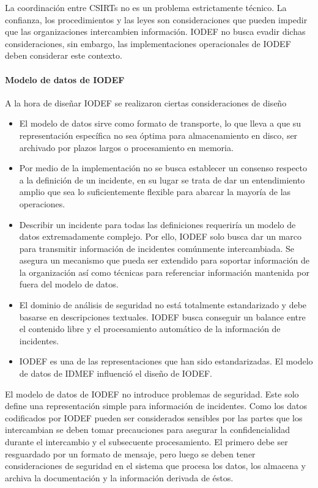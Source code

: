 La coordinación entre CSIRTs no es un problema estrictamente técnico. La 
confianza, los procedimientos y las leyes son consideraciones que pueden impedir 
que las organizaciones intercambien información. IODEF no busca evadir dichas 
consideraciones, sin embargo, las implementaciones operacionales de IODEF deben 
considerar este contexto.

\paragraph{Modelo de datos de IODEF}

A la hora de diseñar IODEF se realizaron ciertas consideraciones de diseño
\begin{itemize}
  \item El modelo de datos sirve como formato de transporte, lo que lleva a que 
  su representación específica no sea óptima para almacenamiento en disco, 
  ser archivado por plazos largos o procesamiento en memoria.
  \item Por medio de la implementación no se busca establecer un consenso 
  respecto a la definición de un incidente, en su lugar se trata de dar un 
  entendimiento amplio que sea lo suficientemente flexible para abarcar la 
  mayoría de las operaciones.
  \item Describir un incidente para todas las definiciones requeriría un modelo 
  de datos extremadamente complejo. Por ello, IODEF solo busca dar un marco para 
  transmitir información de incidentes comúnmente intercambiada. Se asegura un 
  mecanismo que pueda ser extendido para soportar información de la 
  organización así como técnicas para referenciar información mantenida por 
  fuera del modelo de datos.
  \item El dominio de análisis de seguridad no está totalmente estandarizado y 
  debe basarse en descripciones textuales. IODEF busca conseguir un balance 
  entre el contenido libre y el procesamiento automático de la información de 
  incidentes.
  \item IODEF es una de las representaciones que han sido estandarizadas.
   El modelo de datos de IDMEF influenció el diseño de IODEF.

\end{itemize}

El modelo de datos de IODEF no introduce problemas de seguridad. Este solo 
define una representación simple para información de incidentes. Como los datos 
codificados por IODEF pueden ser considerados sensibles por las partes que los 
intercambian se deben tomar precauciones para asegurar la confidencialidad 
durante el intercambio y el subsecuente procesamiento. El primero debe ser 
resguardado por un formato de mensaje, pero luego se deben tener consideraciones 
de seguridad en el sistema que procesa los datos, los almacena y archiva la 
documentación y la información derivada de éstos.

